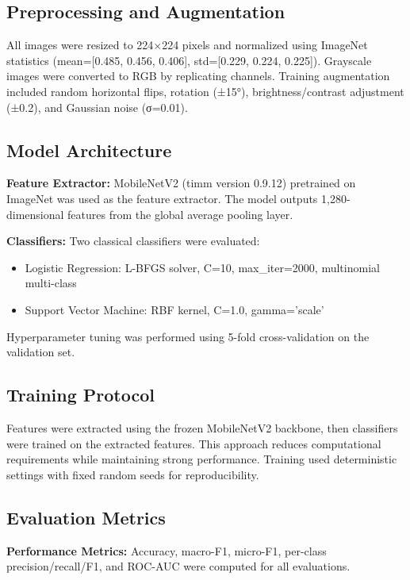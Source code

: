 \documentclass[11pt]{article}
\begin{document}
\subsection{Preprocessing and Augmentation}

All images were resized to 224×224 pixels and normalized using ImageNet statistics (mean=[0.485, 0.456, 0.406], std=[0.229, 0.224, 0.225]). Grayscale images were converted to RGB by replicating channels. Training augmentation included random horizontal flips, rotation (±15°), brightness/contrast adjustment (±0.2), and Gaussian noise (σ=0.01).

\subsection{Model Architecture}

\textbf{Feature Extractor:} MobileNetV2 (timm version 0.9.12) pretrained on ImageNet was used as the feature extractor. The model outputs 1,280-dimensional features from the global average pooling layer.

\textbf{Classifiers:} Two classical classifiers were evaluated:
\begin{itemize}
\item Logistic Regression: L-BFGS solver, C=10, max\_iter=2000, multinomial multi-class
\item Support Vector Machine: RBF kernel, C=1.0, gamma='scale'
\end{itemize}

Hyperparameter tuning was performed using 5-fold cross-validation on the validation set.

\subsection{Training Protocol}

Features were extracted using the frozen MobileNetV2 backbone, then classifiers were trained on the extracted features. This approach reduces computational requirements while maintaining strong performance. Training used deterministic settings with fixed random seeds for reproducibility.

\subsection{Evaluation Metrics}

\textbf{Performance Metrics:} Accuracy, macro-F1, micro-F1, per-class precision/recall/F1, and ROC-AUC were computed for all evaluations.
\end{document}
